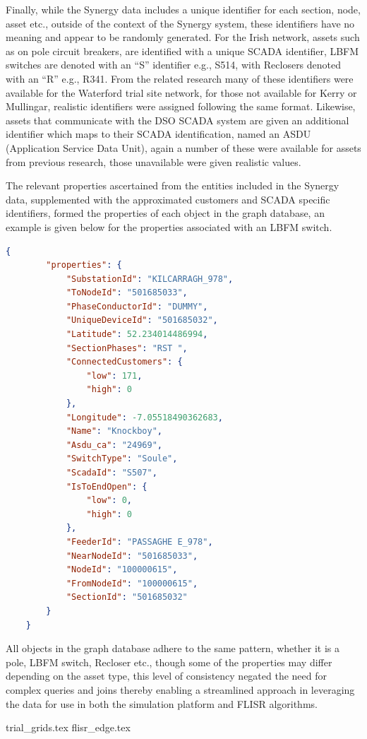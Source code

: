 \noindent Finally, while the Synergy data includes a unique identifier for each section, node, asset etc., outside of the context of the Synergy system, these identifiers have no meaning and appear to be randomly generated. For the Irish network,
assets such as on pole circuit breakers, are identified with a unique SCADA identifier, LBFM switches are denoted with an ``S'' identifier e.g., S514, with Reclosers denoted with an ``R'' e.g., R341. From the related research many of these
identifiers were available for the Waterford trial site network, for those not available for Kerry or Mullingar, realistic identifiers were assigned following the same format. Likewise, assets that communicate with the DSO SCADA system are given an
additional identifier which maps to their SCADA identification, named an ASDU (Application Service Data Unit), again a number of these were available for assets from previous research, those unavailable were given realistic values.

\noindent The relevant properties ascertained from the entities included in the Synergy data, supplemented with the approximated customers and SCADA specific identifiers, formed the properties of each object in the graph database, an example is given below
for the properties associated with an LBFM switch.
\clearpage

\begin{lstlisting}[language=json]
    {
    	"properties": {
    		"SubstationId": "KILCARRAGH_978",
    		"ToNodeId": "501685033",
    		"PhaseConductorId": "DUMMY",
    		"UniqueDeviceId": "501685032",
    		"Latitude": 52.234014486994,
    		"SectionPhases": "RST ",
    		"ConnectedCustomers": {
    			"low": 171,
    			"high": 0
    		},
    		"Longitude": -7.05518490362683,
    		"Name": "Knockboy",
    		"Asdu_ca": "24969",
    		"SwitchType": "Soule",
    		"ScadaId": "S507",
    		"IsToEndOpen": {
    			"low": 0,
    			"high": 0
    		},
    		"FeederId": "PASSAGHE E_978",
    		"NearNodeId": "501685033",
    		"NodeId": "100000615",
    		"FromNodeId": "100000615",
    		"SectionId": "501685032"
    	}
    }
\end{lstlisting}

\noindent All objects in the graph database adhere to the same pattern, whether it is a pole, LBFM switch, Recloser etc., though some of the properties may differ depending on the asset type, this level of consistency
negated the need for complex queries and joins thereby enabling a streamlined approach in leveraging the data for use in both the simulation platform and FLISR algorithms.

{trial_grids.tex}
{flisr_edge.tex}
